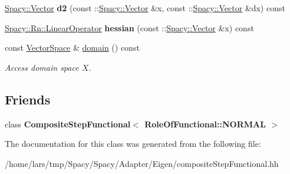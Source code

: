 \begin{DoxyCompactItemize}
\item 
\hyperlink{classSpacy_1_1Vector}{Spacy\+::\+Vector} {\bfseries d2} (const \+::\hyperlink{classSpacy_1_1Vector}{Spacy\+::\+Vector} \&x, const \+::\hyperlink{classSpacy_1_1Vector}{Spacy\+::\+Vector} \&dx) const \hypertarget{classSpacy_1_1Rn_1_1CompositeStepFunctional_aa049e713c6bc06fc271257af31c536c7}{}\label{classSpacy_1_1Rn_1_1CompositeStepFunctional_aa049e713c6bc06fc271257af31c536c7}

\item 
\hyperlink{classSpacy_1_1Rn_1_1LinearOperator}{Spacy\+::\+Rn\+::\+Linear\+Operator} {\bfseries hessian} (const \+::\hyperlink{classSpacy_1_1Vector}{Spacy\+::\+Vector} \&x) const \hypertarget{classSpacy_1_1Rn_1_1CompositeStepFunctional_a0f406c3e04f4374a2e0bfac66ed99fe8}{}\label{classSpacy_1_1Rn_1_1CompositeStepFunctional_a0f406c3e04f4374a2e0bfac66ed99fe8}

\item 
const \hyperlink{classSpacy_1_1VectorSpace}{Vector\+Space} \& \hyperlink{classSpacy_1_1FunctionalBase_a2d3397deb9fa1ad85ed04e37a03b3aa6}{domain} () const \hypertarget{classSpacy_1_1FunctionalBase_a2d3397deb9fa1ad85ed04e37a03b3aa6}{}\label{classSpacy_1_1FunctionalBase_a2d3397deb9fa1ad85ed04e37a03b3aa6}

\begin{DoxyCompactList}\small\item\em Access domain space $X$. \end{DoxyCompactList}\end{DoxyCompactItemize}
\subsection*{Friends}
\begin{DoxyCompactItemize}
\item 
class {\bfseries Composite\+Step\+Functional$<$ Role\+Of\+Functional\+::\+N\+O\+R\+M\+A\+L $>$}\hypertarget{classSpacy_1_1Rn_1_1CompositeStepFunctional_ab4d23f390bcf90bf58fd77a6dadc9f7e}{}\label{classSpacy_1_1Rn_1_1CompositeStepFunctional_ab4d23f390bcf90bf58fd77a6dadc9f7e}

\end{DoxyCompactItemize}


The documentation for this class was generated from the following file\+:\begin{DoxyCompactItemize}
\item 
/home/lars/tmp/\+Spacy/\+Spacy/\+Adapter/\+Eigen/composite\+Step\+Functional.\+hh\end{DoxyCompactItemize}
